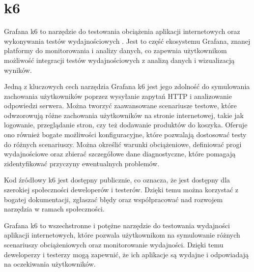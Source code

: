 \section{k6}

Grafana k6 to narzędzie do testowania obciążenia aplikacji internetowych oraz wykonywania testów wydajnościowych \cite{grafanak6}.
Jest to część ekosystemu Grafana, znanej platformy do monitorowania i analizy danych, co zapewnia użytkownikom możliwość integracji testów wydajnościowych z analizą danych i wizualizacją wyników.

Jedną z kluczowych cech narzędzia Grafana k6 jest jego zdolność do symulowania zachowania użytkowników poprzez wysyłanie zapytań HTTP i analizowanie odpowiedzi serwera.
Można tworzyć zaawansowane scenariusze testowe, które odwzorowują różne zachowania użytkowników na stronie internetowej, takie jak logowanie, przeglądanie stron, czy też dodawanie produktów do koszyka.
Oferuje ono również bogate możliwości konfiguracyjne, które pozwalają dostosować testy do różnych scenariuszy.
Można określić warunki obciążeniowe, definiować progi wydajnościowe oraz zbierać szczegółowe dane diagnostyczne, które pomagają zidentyfikować przyczyny ewentualnych problemów.

Kod źródłowy k6 jest dostępny publicznie, co oznacza, że jest dostępny dla szerokiej społeczności deweloperów i testerów.
Dzięki temu można korzystać z bogatej dokumentacji, zgłaszać błędy oraz współpracować nad rozwojem narzędzia w ramach społeczności.

Grafana k6 to wszechstronne i potężne narzędzie do testowania wydajności aplikacji internetowych, które pozwala użytkownikom na symulowanie różnych scenariuszy obciążeniowych oraz monitorowanie wydajności.
Dzięki temu deweloperzy i testerzy mogą zapewnić, że ich aplikacje są wydajne i odpowiadają na oczekiwania użytkowników.
